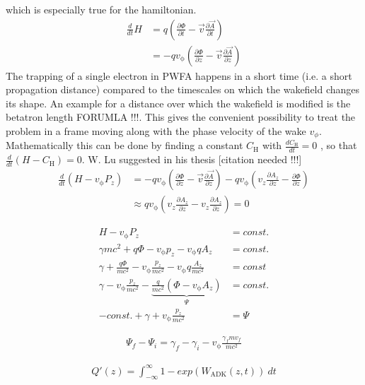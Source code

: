 \documentclass{thesis}
\begin{document}
which is especially true for the hamiltonian.
\begin{align*}
\frac{d}{dt}H&=q(\frac{\partial \Phi}{\partial t}-\vec{v}\frac{\partial \vec{A}}{\partial t})\\
&=-q v_\mathrm{\phi}(\frac{\partial \Phi}{\partial z}-\vec{v} \frac{\partial \vec{A}}{\partial z})
\end{align*}
The trapping of a single electron in PWFA happens in a short time (i.e. a short propagation distance) compared to the timescales on which the wakefield changes its shape. An example for a distance over which the wakefield is modified is the betatron length FORUMLA !!!.
This gives the convenient possibility to treat the problem in a frame moving along with the phase velocity of the wake $v_\phi$. Mathematically this can be done by finding a constant $C_\mathrm{H}$ with $\frac{d C_\mathrm{H}}{dt}=0$ , so that $\frac{d}{dt}(H-C_\mathrm{H})=0$.
W. Lu suggested in his thesis [citation needed !!!] 
\begin{align*}
\frac{d}{dt}(H-v_\mathrm{\phi} P_z)&=-qv_\mathrm{\phi}(\frac{\partial \Phi}{\partial z}-\vec{v}\frac{\partial \vec{A}}{\partial z})-qv_\mathrm{\phi}(v_z \frac{\partial A_z}{\partial z}-\frac{\partial \Phi}{\partial z})\\
&\approx q v_\mathrm{\phi}(v_z \frac{\partial A_z}{\partial z}-v_z \frac{\partial A_z}{\partial z})=0
\end{align*}

\begin{align*}
H-v_\mathrm{\phi}P_z&=const.\\
\gamma m c^2+q\Phi-v_\mathrm{\phi}p_z-v_\mathrm{\phi}qA_z&=const.\\
\gamma+\frac{q\Phi}{mc^2}-v_\mathrm{\phi}\frac{p_z}{mc^2}-v_\mathrm{\phi}q\frac{A_z}{mc^2}&=const\\
\gamma-v_\mathrm{\phi}\frac{p_z}{mc^2}-\underbrace{\frac{q}{mc^2}(\Phi-v_\mathrm{\phi}A_z)}_{\Psi}&=const.\\
-const. +\gamma + v_\mathrm{\phi}\frac{p_z}{mc^2}&=\Psi
\end{align*}

\begin{align*}
\Psi_f-\Psi_i=\gamma_f-\gamma_i-v_\mathrm{\phi}\frac{\gamma_f m v_f}{mc^2}
\end{align*}

\begin{align*}
Q'(z)=\int_{-\infty}^{\infty}1- exp(W_\mathrm{ADK}(z,t))\ dt
\end{align*}



    
\end{document}
